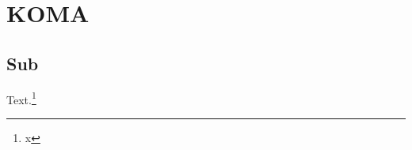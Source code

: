 \documentclass[12pt,a4paper]{scrartcl}
\begin{document}
\section{KOMA}\subsection{Sub} Text.\footnote{x}
\end{document}
